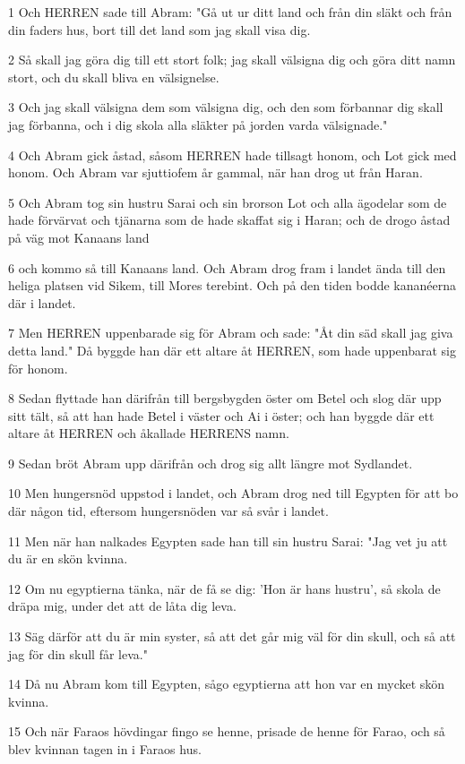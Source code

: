 \par 1 Och HERREN sade till Abram: "Gå ut ur ditt land och från din släkt och från din faders hus, bort till det land som jag skall visa dig.
\par 2 Så skall jag göra dig till ett stort folk; jag skall välsigna dig och göra ditt namn stort, och du skall bliva en välsignelse.
\par 3 Och jag skall välsigna dem som välsigna dig, och den som förbannar dig skall jag förbanna, och i dig skola alla släkter på jorden varda välsignade."
\par 4 Och Abram gick åstad, såsom HERREN hade tillsagt honom, och Lot gick med honom. Och Abram var sjuttiofem år gammal, när han drog ut från Haran.
\par 5 Och Abram tog sin hustru Sarai och sin brorson Lot och alla ägodelar som de hade förvärvat och tjänarna som de hade skaffat sig i Haran; och de drogo åstad på väg mot Kanaans land
\par 6 och kommo så till Kanaans land. Och Abram drog fram i landet ända till den heliga platsen vid Sikem, till Mores terebint. Och på den tiden bodde kananéerna där i landet.
\par 7 Men HERREN uppenbarade sig för Abram och sade: "Åt din säd skall jag giva detta land." Då byggde han där ett altare åt HERREN, som hade uppenbarat sig för honom.
\par 8 Sedan flyttade han därifrån till bergsbygden öster om Betel och slog där upp sitt tält, så att han hade Betel i väster och Ai i öster; och han byggde där ett altare åt HERREN och åkallade HERRENS namn.
\par 9 Sedan bröt Abram upp därifrån och drog sig allt längre mot Sydlandet.
\par 10 Men hungersnöd uppstod i landet, och Abram drog ned till Egypten för att bo där någon tid, eftersom hungersnöden var så svår i landet.
\par 11 Men när han nalkades Egypten sade han till sin hustru Sarai: "Jag vet ju att du är en skön kvinna.
\par 12 Om nu egyptierna tänka, när de få se dig: 'Hon är hans hustru', så skola de dräpa mig, under det att de låta dig leva.
\par 13 Säg därför att du är min syster, så att det går mig väl för din skull, och så att jag för din skull får leva."
\par 14 Då nu Abram kom till Egypten, sågo egyptierna att hon var en mycket skön kvinna.
\par 15 Och när Faraos hövdingar fingo se henne, prisade de henne för Farao, och så blev kvinnan tagen in i Faraos hus.

